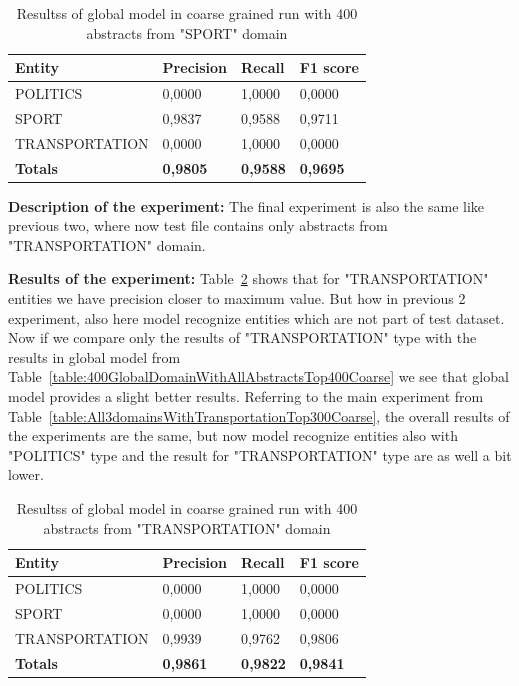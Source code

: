 \documentclass[thesis=M,english]{FITthesis}[2018/05/30]
\begin{document}
	\begin{table}[H]\centering
		\begin{tabular}{|l|l|l|l|}
			\hline {\textbf{Entity}} & {\textbf{Precision}} & {\textbf{Recall}} & {\textbf{F1 score}}\\\hline
				POLITICS & 0,0000 & 1,0000 & 0,0000\\
				SPORT & 0,9837 & 0,9588 & 0,9711\\
				TRANSPORTATION & 0,0000 & 1,0000 & 0,0000\\\hline
				\textbf{Totals} & \textbf{0,9805} & \textbf{0,9588} & \textbf{0,9695}\\\hline
		\end{tabular}
		\caption{Resultss of global model in coarse grained run with 400 abstracts from "SPORT" domain \label{table:400GlobalDomainWithSportTop400Coarse}}
	\end{table}	

\textbf{Description of the experiment:} The final experiment is also the same like previous two, where now test file contains only abstracts from "TRANSPORTATION" domain.

\textbf{Results of the experiment:} Table~\ref{table:400GlobalDomainWithTransportationTop400Coarse} shows that for "TRANSPORTATION" entities we have precision closer to maximum value. But how in previous 2 experiment, also here model recognize entities which are not part of test dataset. Now if we compare only the results of "TRANSPORTATION" type with the results in global model from Table~\ref{table:400GlobalDomainWithAllAbstractsTop400Coarse} we see that global model provides a slight better results. Referring to the main experiment from Table~\ref{table:All3domainsWithTransportationTop300Coarse}, the overall results of the experiments are the same, but now model recognize entities also with "POLITICS" type and the result for "TRANSPORTATION" type are as well a bit lower.

	\begin{table}[H]\centering
		\begin{tabular}{|l|l|l|l|}
			\hline {\textbf{Entity}} & {\textbf{Precision}} & {\textbf{Recall}} & {\textbf{F1 score}}\\\hline
				POLITICS & 0,0000 & 1,0000 & 0,0000\\
				SPORT & 0,0000 & 1,0000 & 0,0000\\
				TRANSPORTATION & 0,9939 & 0,9762 & 0,9806\\\hline
				\textbf{Totals} & \textbf{0,9861} & \textbf{0,9822} & \textbf{0,9841}\\\hline
		\end{tabular}
		\caption{Resultss of global model in coarse grained run with 400 abstracts from "TRANSPORTATION" domain \label{table:400GlobalDomainWithTransportationTop400Coarse}}
	\end{table}	
		
\end{document}
